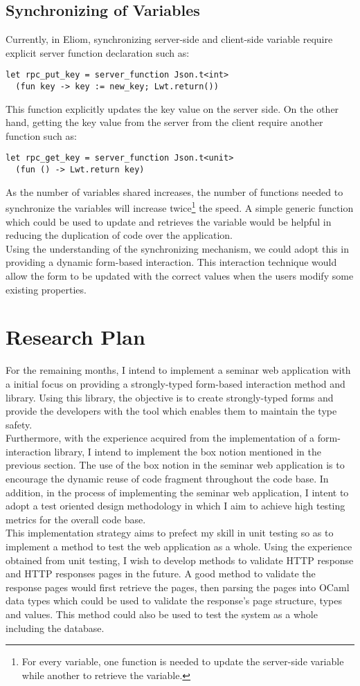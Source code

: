 \documentclass[12pt,fullpage]{article}
\begin{document}
\subsection{Synchronizing of Variables}
Currently, in Eliom, synchronizing server-side and client-side variable require
explicit server function declaration such as:
\begin{verbatim}
let rpc_put_key = server_function Json.t<int>
  (fun key -> key := new_key; Lwt.return())
\end{verbatim}
This function explicitly updates the key value on the server side. On the other
hand, getting the key value from the server from the client require another function
such as:
\begin{verbatim}
let rpc_get_key = server_function Json.t<unit>
  (fun () -> Lwt.return key)
\end{verbatim}
As the number of variables shared increases, the number of functions needed to
synchronize the variables will increase twice\footnote{For every variable,
one function is needed to update the server-side variable while another to
retrieve the variable.} the speed. A simple generic function which could
be used to update and retrieves the variable would be helpful in reducing
the duplication of code over the application.
\\
Using the understanding of the synchronizing mechanism, we could adopt this
in providing a dynamic form-based interaction. This interaction technique
would allow the form to be updated with the correct values when the users
modify some existing properties.

\section{Research Plan}
For the remaining months, I intend to implement a seminar web application with
a initial focus on providing a strongly-typed form-based interaction method and
library. Using this library, the objective is to create strongly-typed forms
and provide the developers with the tool which enables them to maintain the type
safety.
\\
Furthermore, with the experience acquired from the implementation of a
form-interaction library, I intend to implement the box notion mentioned in the
previous section. The use of the box notion in the seminar web application is to
encourage the dynamic reuse of code fragment throughout the code base. In
addition, in the process of implementing the seminar web application, I intent
to adopt a test oriented design methodology in which I aim to achieve high
testing metrics for the overall code base.
\\
This implementation strategy aims to prefect my skill in unit testing so as to
implement a method to test the web application as a whole. Using the experience
obtained from unit testing, I wish to develop methods to validate HTTP response
and HTTP responses pages in the future. A good method to validate the response
pages would first retrieve the pages, then parsing the pages into OCaml data
types which could be used to validate the response's page structure, types and
values. This method could also be used to test the system as a whole including
the database.

\printbibliography
\end{document}
